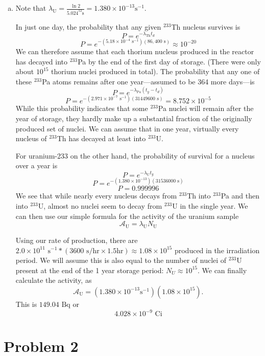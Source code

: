 \documentclass{report}
\begin{document}
\begin{enumerate}[a)]
\item 

Note that $\lambda_{\text{U}} = \frac{\ln 2}{5.024^{12}\text{s}} = 1.380\times10^{-13}\text{s}^{-1}$. 

In just one day, the probability that any given $^{233}$Th nucleus survives is
$$ P = e^{-\lambda_{\text{Th}}t_d} $$
$$ P = e^{-(5.18\times10^{-4}\text{ s}^{-1})(86,400\text{ s})} \approx 10^{-20} $$
We can therefore assume that each thorium nucleus produced in the reactor has decayed into $^{233}$Pa by the end of the first day of storage. (There were only about $10^{15}$ thorium nuclei produced in total).
The probability that any one of these $^{233}$Pa atoms remains after one year---assumed to be 364 more days---is
$$ P = e^{-\lambda_{\text{Pa}}(t_y-t_d)} $$
$$ P = e^{-(2.971\times10^{-7}\text{ s}^{-1})(31449600\text{ s})} = 8.752\times10^{-5}  $$
While this probability indicates that some $^{233}$Pa nuclei will remain after the year of storage, they hardly make up a substantial fraction of the originally produced set of nuclei. We can assume that in one year, virtually every nucleus of $^{233}$Th has decayed at least into $^{233}$U.  

For uranium-233 on the other hand, the probability of survival for a nucleus over a year is
$$ P = e^{-\lambda_{\text{U}}t_y} $$
$$ P = e^{-(1.380\times10^{-13})(31536000\text{ s})} $$
$$ P = 0.999996 $$
We see that while nearly every nucleus decays from $^{233}$Th into $^{233}$Pa and then into $^{233}$U, almost no nuclei seem to decay from $^{233}$U in the single year.
We can then use our simple formula for the activity of the uranium sample
$$ \mathcal{A}_{\text{U}} = \lambda_{\text{U}} N_{\text{U}}$$

Using our rate of production, there are $2.0\times10^{11}\text{ s}^{-1}*(3600\text{ s/hr}\times 1.5 \text{hr}) \approx 1.08\times10^{15}$ produced in the irradiation period. We will assume this is also equal to the number of nuclei of $^{233}$U present at the end of the 1 year storage period: $N_U \approx 10^{15}$. We can finally calculate the activity, as 
$$ \mathcal{A}_{\text{U}} = (1.380\times10^{-13}\text{s}^{-1})(1.08\times10^{15}) .$$
This is ${149.04}\text{ Bq}$ or 
$$\boxed{ 4.028\times10^{-9}\text{ Ci} }$$
\end{enumerate}


\newpage
\section*{Problem 2}
\end{document}
